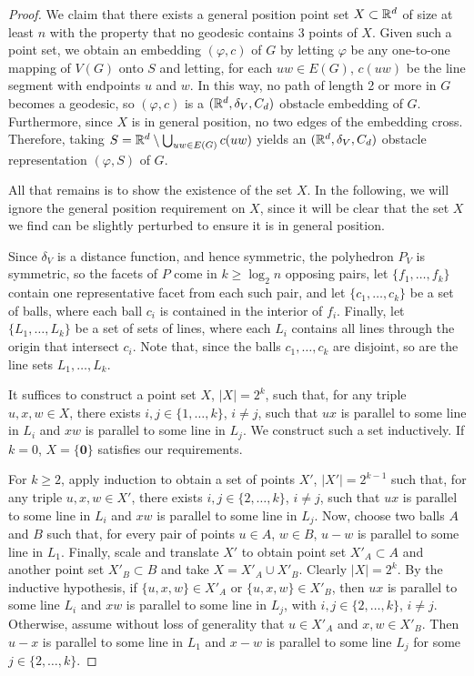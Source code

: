 \documentclass{patmorin}
\begin{document}
\begin{proof}
   We claim that there exists a general position point set $X\subset\mathbb{R}^d$
   of size at least $n$ with the property that no geodesic contains
   3 points of $X$.  Given such a point set, we obtain an embedding
   $(\varphi,c)$  of $G$ by letting $\varphi$ be any one-to-one mapping
   of $V(G)$ onto $S$ and letting, for each $uw\in E(G)$, $c(uw)$ be
   the line segment with endpoints $u$ and $w$.  In this way, no path
   of length 2 or more in $G$ becomes a geodesic, so $(\varphi,c)$ is
   a $(\mathbb{R}^d,\delta_{V},C_d)$ obstacle embedding of $G$.  Furthermore,
   since $X$ is in general position, no two edges of the embedding cross.
   Therefore, taking $S=\mathbb{R}^d\setminus \bigcup_{uw\in E(G)} c(uw)$ yields
   an $(\mathbb{R}^d,\delta_{V},C_d)$ obstacle representation $(\varphi,S)$
   of $G$.

   All that remains is to show the existence of the set $X$.  In the
   following, we will ignore the general position requirement on $X$,
   since it will be clear that the set $X$ we find can be slightly
   perturbed to ensure it is in general position.

   Since $\delta_{V}$ is a distance function, and hence symmetric,
   the polyhedron $P_{V}$ is symmetric, so the facets of $P$
   come in $k\ge \log_2 n$ opposing pairs, let $\{f_1,\ldots,f_{k}\}$
   contain one representative facet from each such pair, and let
   $\{c_1,\ldots,c_{k}\}$ be a set of balls, where each ball $c_i$ is
   contained in the interior of $f_i$. Finally, let $\{L_1,\ldots,L_{k}\}$
   be a set of sets of lines, where each $L_i$ contains all lines
   through the origin that intersect $c_i$.  Note that, since the
   balls $c_1,\ldots,c_{k}$ are disjoint, so are the line sets
   $L_1,\ldots,L_{k}$.

   It suffices to construct a point set $X$, $|X|=2^{k}$, such that,
   for any triple $u,x,w\in X$, there exists $i,j\in\{1,\ldots,k\}$,
   $i\neq j$, such that $ux$ is parallel to some line in $L_i$ and $xw$ is
   parallel to some line in $L_j$.  We construct such a set inductively.
   If $k=0$, $X=\{\textbf{0}\}$ satisfies our requirements.

   For $k\ge 2$, apply induction to obtain a set of points $X'$,
   $|X'|=2^{k-1}$ such that, for any triple $u,x,w\in X'$, there exists
   $i,j\in\{2,\ldots,k\}$, $i\neq j$, such that $ux$ is parallel to
   some line in $L_i$ and $xw$ is parallel to some line in $L_j$.  Now,
   choose two balls $A$ and $B$ such that, for every pair of points
   $u\in A$, $w\in B$, $u-w$ is parallel to some line in $L_{1}$.
   Finally, scale and translate $X'$ to obtain point set $X'_A\subset
   A$ and another point set $X'_B\subset B$ and take $X=X'_A\cup X'_B$.
   Clearly $|X|=2^k$.  By the inductive hypothesis, if $\{u,x,w\}\in X'_A$
   or $\{u,x,w\}\in X'_B$, then $ux$ is parallel to some line $L_i$ and
   $xw$ is parallel to some line in $L_j$, with $i,j\in\{2,\ldots,k\}$,
   $i\neq j$.  Otherwise, assume without loss of generality that $u\in
   X'_A$ and $x,w\in X'_B$.  Then $u-x$ is parallel to some line in $L_1$
   and $x-w$ is parallel to some line $L_j$ for some $j\in\{2,\ldots,k\}$.
\end{proof}
\end{document}
